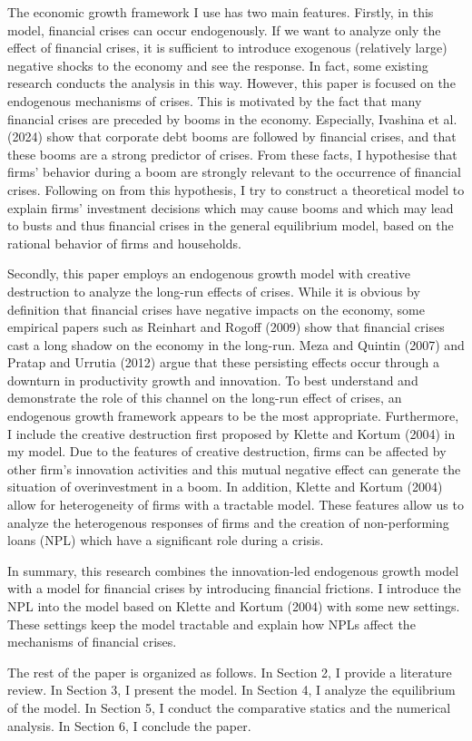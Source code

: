 \documentclass[a4paper,12pt]{article}
\begin{document}
The economic growth framework I use has two main features. Firstly, in this model, financial crises can occur endogenously. If we want to analyze only the effect of financial crises, it is sufficient to introduce exogenous (relatively large) negative shocks to the economy and see the response. In fact, some existing research conducts the analysis in this way. However, this paper is focused on the endogenous mechanisms of crises. This is motivated by the fact that many financial crises are preceded by booms in the economy. Especially, Ivashina et al. (2024) show that corporate debt booms are followed by financial crises, and that these booms are a strong predictor of crises. From these facts, I hypothesise that firms' behavior during a boom are strongly relevant to the occurrence of financial crises. Following on from this hypothesis, I try to construct a theoretical model to explain firms' investment decisions which may cause booms and which may lead to busts and thus financial crises in the general equilibrium model, based on the rational behavior of firms and households. \par
Secondly, this paper employs an endogenous growth model with creative destruction to analyze the long-run effects of crises. While it is obvious by definition that financial crises have negative impacts on the economy, some empirical papers such as Reinhart and Rogoff (2009) show that financial crises cast a long shadow on the economy in the long-run. Meza and Quintin (2007) and Pratap and Urrutia (2012) argue that these persisting effects occur through a downturn in productivity growth and innovation. To best understand and demonstrate the role of this channel on the long-run effect of crises, an endogenous growth framework appears to be the most appropriate. Furthermore, I include the creative destruction first proposed by Klette and Kortum (2004) in my model. Due to the features of creative destruction, firms can be affected by other firm's innovation activities and this mutual negative effect can generate the situation of overinvestment in a boom. In addition, Klette and Kortum (2004) allow for heterogeneity of firms with a tractable model. These features allow us to analyze the heterogenous responses of firms and the creation of non-performing loans (NPL) which have a significant role during a crisis.\par
In summary, this research combines the innovation-led endogenous growth model with a model for financial crises by introducing financial frictions. I introduce the NPL into the model based on Klette and Kortum (2004) with some new settings. These settings keep the model tractable and explain how NPLs affect the mechanisms of financial crises. \par
The rest of the paper is organized as follows. In Section 2, I provide a literature review. In Section 3, I present the model. In Section 4, I analyze the equilibrium of the model. In Section 5, I conduct the comparative statics and the numerical analysis. In Section 6, I conclude the paper.
\end{document}
